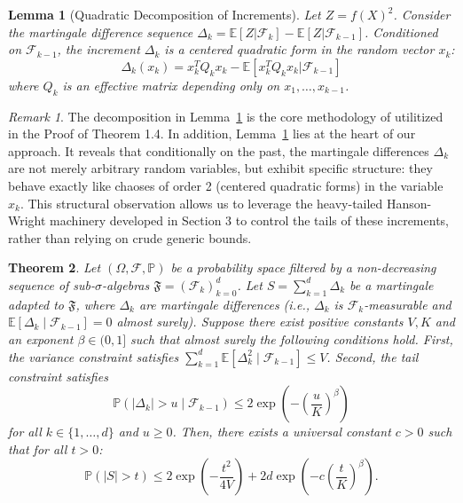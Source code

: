 \documentclass[11pt]{amsart}
\newtheorem{theorem}{Theorem}[section]
\newtheorem{lemma}[theorem]{Lemma}
\theoremstyle{definition}
\theoremstyle{remark}
\newtheorem*{remark}{Remark}
\begin{document}
\begin{lemma}[Quadratic Decomposition of Increments]\label{lem:5.2}
Let $Z = f(X)^2$. Consider the martingale difference sequence $\Delta_k = \mathbb{E}[Z | \mathcal{F}_k] - \mathbb{E}[Z | \mathcal{F}_{k-1}]$. Conditioned on $\mathcal{F}_{k-1}$, the increment $\Delta_k$ is a centered quadratic form in the random vector $x_k$:
\begin{equation}
\Delta_k(x_k) = x_k^T Q_k x_k - \mathbb{E}[x_k^T Q_k x_k | \mathcal{F}_{k-1}]
\end{equation}
where $Q_k$ is an effective matrix depending only on $x_1, \dots, x_{k-1}$.
\end{lemma}

\begin{remark}
The decomposition in Lemma~\ref{lem:5.2} is the core methodology of \cite{Vershynin2020} utilitized in the Proof of Theorem 1.4. In addition, Lemma~\ref{lem:5.2} lies at the heart of our approach. It reveals that conditionally on the past, the martingale differences $\Delta_k$ are not merely arbitrary random variables, but exhibit specific structure: they behave exactly like chaoses of order 2 (centered quadratic forms) in the variable $x_k$. This structural observation allows us to leverage the heavy-tailed Hanson-Wright machinery developed in Section 3 to control the tails of these increments, rather than relying on crude generic bounds.
\end{remark}

\begin{theorem}\label{thm:5.3}
Let $(\Omega, \mathcal{F}, \mathbb{P})$ be a probability space filtered by a non-decreasing sequence of sub-$\sigma$-algebras $\mathfrak{F} = (\mathcal{F}_k)_{k=0}^d$. Let $S = \sum_{k=1}^d \Delta_k$ be a martingale adapted to $\mathfrak{F}$, where $\Delta_k$ are martingale differences (i.e., $\Delta_k$ is $\mathcal{F}_k$-measurable and $\mathbb{E}[\Delta_k \mid \mathcal{F}_{k-1}] = 0$ almost surely). Suppose there exist positive constants $V, K$ and an exponent $\beta \in (0, 1]$ such that almost surely the following conditions hold. First, the variance constraint satisfies $\sum_{k=1}^d \mathbb{E}[\Delta_k^2 \mid \mathcal{F}_{k-1}] \le V$. Second, the tail constraint satisfies
\begin{equation}
\mathbb{P}(|\Delta_k| > u \mid \mathcal{F}_{k-1}) \le 2 \exp\left( - \left( \frac{u}{K} \right)^\beta \right)
\end{equation}
for all $k \in \{1, \dots, d\}$ and $u \ge 0$. Then, there exists a universal constant $c > 0$ such that for all $t > 0$:
\begin{equation}
\mathbb{P}(|S| > t) \le 2 \exp\left( - \frac{t^2}{4V} \right) + 2 d \exp\left( - c \left( \frac{t}{K} \right)^\beta \right).
\end{equation}
\end{theorem}
\end{document}
